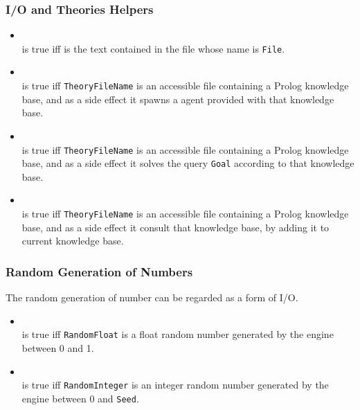 \subsubsection{I/O and Theories Helpers}
%
\begin{itemize}
%
\item {}\\
\noindent{} is true iff  is
the text contained in the file whose name is \texttt{File}.\\
%
%
\item {}\\
\noindent{} is true iff
\texttt{TheoryFileName} is an accessible file containing a Prolog
knowledge base, and as a side effect it spawns a \tuprolog{} agent
provided with that knowledge base.\\
%
%
\item {}\\
\noindent{} is true iff
\texttt{TheoryFileName} is an accessible file containing a Prolog
knowledge base, and as a side effect it solves the query \texttt{Goal}
according to that knowledge base.\\
%
%
\item {}\\
\noindent{} is true iff
\texttt{TheoryFileName} is an accessible file containing a Prolog
knowledge base, and as a side effect it consult that knowledge base,
by adding it to current knowledge base.\\
%
\end{itemize}

\subsubsection{Random Generation of Numbers}

\noindent The random generation of number can be regarded as a form of
I/O.

\begin{itemize}
%
\item {}\\
\noindent{} is true iff
\texttt{RandomFloat} is a float random number generated by the
engine between 0 and 1.\\
%
\item {}\\
\noindent{} is true iff
\texttt{RandomInteger} is an integer random number generated by
the engine between 0 and \texttt{Seed}.\\
%
\end{itemize}
